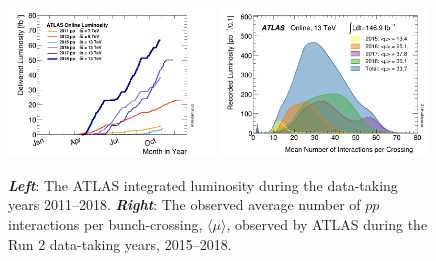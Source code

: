 \begin{figure}[!htb]
    \begin{center}
        \includegraphics[width=0.49\textwidth]{figures/chapter2/int_lumi_multiyear}
        \includegraphics[width=0.49\textwidth]{figures/chapter2/mu_run2}
        \caption{
            \textbf{\textit{Left}}: The ATLAS integrated luminosity during the data-taking years 2011--2018.
            \textbf{\textit{Right}}: The observed average number of $pp$ interactions per bunch-crossing, $\langle \mu \rangle$,
                observed by ATLAS during the Run 2 data-taking years, 2015--2018.
        }
        \label{fig:int_lumi_multiyear}
    \end{center}
\end{figure}

